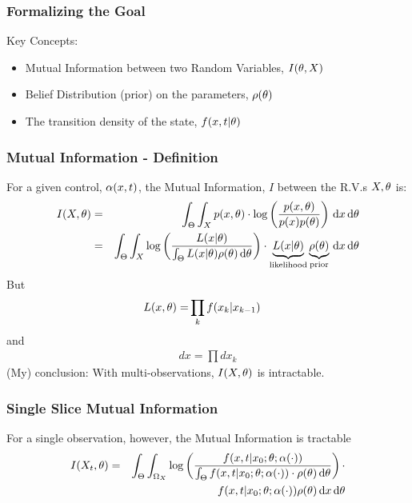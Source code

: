 \documentclass{beamer}
\begin{document}
\begin{frame}
\frametitle{Formalizing the Goal}
Key Concepts:
\begin{itemize}
  \item Mutual Information between two Random Variables, $I({\theta}, X)$
  \item Belief Distribution (prior) on the parameters, $\rho({\theta})$ 
  \item The transition density of the state, $f(x,t | {\theta})$
\end{itemize}
\end{frame} 
\begin{frame}
\frametitle{Mutual Information - Definition}
For a given control, ${\alpha}(x,t)$, the Mutual Information, $I$ between the R.V.s
$X,{\theta}$ is:
\begin{eqnarray*}
I(X,{\theta}) &=& \int_\Theta \int_X p(x,{\theta}) \cdot \log \left(
\frac{p(x,{\theta})}{p(x)p({\theta})}\right) \, \mathrm{d} x \, \mathrm{d} {\theta}
\\
&=& \int_\Theta \int_X 
\log \left( \frac{L(x|{\theta})  }
				 {\int_\Theta L(x|{\theta})
\rho({\theta})  \, \mathrm{d} {\theta}} \right)
\cdot
 \underbrace{L(x|{\theta})}_{\textrm{likelihood}}\underbrace{\rho({\theta})}_{\textrm{prior}} 
\, \mathrm{d} x\, \mathrm{d} {\theta}
\end{eqnarray*}
\pause
But
\begin{eqnarray*}
L(x,{\theta}) =& \prod_k f(x_k | x_{k-1}) 
\end{eqnarray*}
and
 \begin{eqnarray*}
	dx = \prod {dx_k}
 \end{eqnarray*} 
\pause
(My) conclusion: With multi-observations, $I(X,{\theta})$ is intractable.
\end{frame} 


\begin{frame}
\frametitle{Single Slice Mutual Information}
For a single observation, however, the Mutual Information is tractable
\begin{eqnarray*}
I(X_t,{\theta}) &=& 
\int_\Theta \int_{{\Omega}_X} 
\log \left( \frac{f(x,t| x_0; {\theta} ; {\alpha}(\cdot) ) }
				 {\int_\Theta f(x,t| x_0; {\theta} ; {\alpha}(\cdot) )
\cdot \rho({\theta}) \, \mathrm{d} {\theta} } \right)
\cdot \\&&
\quad \quad \quad  f(x,t| x_0; {\theta} ; {\alpha}(\cdot) ) \rho({\theta}) 
\, \mathrm{d} x\, \mathrm{d} {\theta}
\end{eqnarray*}

\end{frame}
\end{document}
